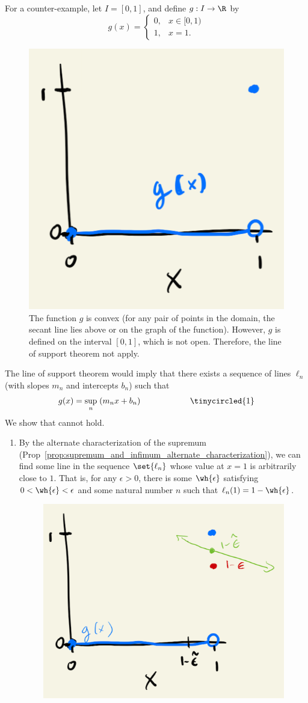 \documentclass{article} %
\begin{document}
\begin{remark}
For a counter-example, let $I = [0,1]$, and define $g : I \to \R$ by 
\[ 
g(x) = 
\begin{cases}
0, & x \in [0,1) \\
1, & x = 1.	
\end{cases}
\]	

\begin{figure}[H] 
\centering
\includegraphics[width=.3\textwidth]{images/line_of_support_counterexample}
\caption{The function $g$ is convex (for any pair of points in the domain, the secant line lies above or on the graph of the function).  However, $g$ is defined on the interval $[0,1]$, which is not open.  Therefore, the line of support theorem not apply.}
\end{figure}

The line of support theorem would imply that there exists a sequence of lines $\ell_n$ (with slopes $m_n$ and intercepts $b_n$) such that 
\[ g(x) = \sup_n \; (m_n x + b_n) \qquad \qquad \qquad \tinycircled{1} \] 
We show that  cannot hold.

\begin{enumerate}

\item By the alternate characterization of the supremum (Prop~\ref{prop:supremum_and_infimum_alternate_characterization}), we can find some line in the sequence $\set{\ell_n}$ whose value at $x=1$ is arbitrarily close to $1$. That is, for any $\epsilon >0$, there is some $\wh{\epsilon}$ satisfying $0 < \wh{\epsilon} < \epsilon$ and some natural number $n$ such that $\ell_n(1) = 1 - \wh{\epsilon}$. 

\begin{figure}[H] 
\centering
\includegraphics[width=.4\textwidth]{images/line_of_support_counterexample_2}
\end{figure}



\end{enumerate}
\end{remark}
\end{document}

